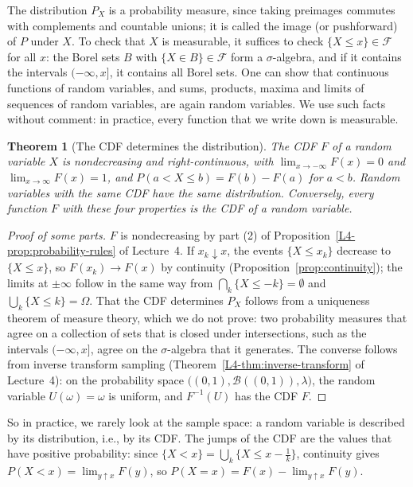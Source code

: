 \documentclass[11pt]{article}
\theoremstyle{definition}
\theoremstyle{plain}
\newtheorem{theorem}[definition]{Theorem}
\theoremstyle{remark}
\begin{document}
The distribution $P_X$ is a probability measure, since taking preimages commutes with complements and countable unions; it is called the image (or pushforward) of $P$ under $X$. To check that $X$ is measurable, it suffices to check $\{X \leq x\} \in \mathcal{F}$ for all $x$: the Borel sets $B$ with $\{X \in B\} \in \mathcal{F}$ form a $\sigma$-algebra, and if it contains the intervals $(-\infty, x]$, it contains all Borel sets. One can show that continuous functions of random variables, and sums, products, maxima and limits of sequences of random variables, are again random variables. We use such facts without comment: in practice, every function that we write down is measurable.

\begin{theorem}[The CDF determines the distribution]\label{thm:cdf}
    The CDF $F$ of a random variable $X$ is nondecreasing and right-continuous, with $\lim_{x \to -\infty} F(x) = 0$ and $\lim_{x \to \infty} F(x) = 1$, and $P(a < X \leq b) = F(b) - F(a)$ for $a < b$. Random variables with the same CDF have the same distribution. Conversely, every function $F$ with these four properties is the CDF of a random variable.
\end{theorem}

\begin{proof}[Proof of some parts]
    $F$ is nondecreasing by part (2) of Proposition~\ref{L4-prop:probability-rules} of Lecture~4. If $x_k \downarrow x$, the events $\{X \leq x_k\}$ decrease to $\{X \leq x\}$, so $F(x_k) \to F(x)$ by continuity (Proposition~\ref{prop:continuity}); the limits at $\pm\infty$ follow in the same way from $\bigcap_k \{X \leq -k\} = \emptyset$ and $\bigcup_k \{X \leq k\} = \Omega$. That the CDF determines $P_X$ follows from a uniqueness theorem of measure theory, which we do not prove: two probability measures that agree on a collection of sets that is closed under intersections, such as the intervals $(-\infty, x]$, agree on the $\sigma$-algebra that it generates. The converse follows from inverse transform sampling (Theorem~\ref{L4-thm:inverse-transform} of Lecture~4): on the probability space $\big((0, 1), \mathcal{B}((0, 1)), \lambda\big)$, the random variable $U(\omega) = \omega$ is uniform, and $F^{-1}(U)$ has the CDF $F$.
\end{proof}

So in practice, we rarely look at the sample space: a random variable is described by its distribution, i.e., by its CDF. The jumps of the CDF are the values that have positive probability: since $\{X < x\} = \bigcup_k \{X \leq x - \frac{1}{k}\}$, continuity gives $P(X < x) = \lim_{y \uparrow x} F(y)$, so $P(X = x) = F(x) - \lim_{y \uparrow x} F(y)$.
\end{document}
